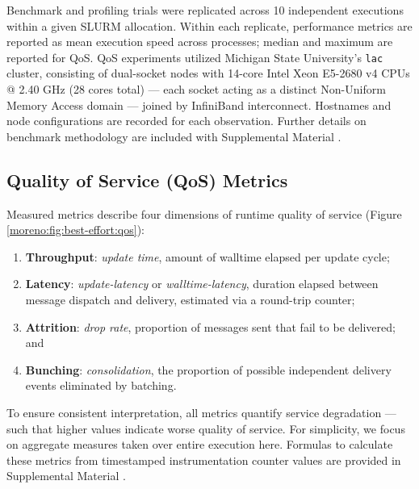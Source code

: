 Benchmark and profiling trials were replicated across 10 independent executions within a given SLURM allocation.
Within each replicate, performance metrics are reported as mean execution speed across processes; median and maximum are reported for QoS.
QoS experiments utilized Michigan State University's \texttt{lac} cluster, consisting of dual-socket nodes with 14-core Intel Xeon E5-2680 v4 CPUs @ 2.40 GHz (28 cores total) --- each socket acting as a distinct Non-Uniform Memory Access domain --- joined by InfiniBand interconnect.
Hostnames and node configurations are recorded for each observation.
Further details on benchmark methodology are included with Supplemental Material \cite{moreno_2026_trust}.

\subsection{Quality of Service (QoS) Metrics}
\label{moreno:sec:case1:metrics}

Measured metrics describe four dimensions of runtime quality of service (Figure \ref{moreno:fig:best-effort:qos}):
\begin{enumerate}
\item \textbf{Throughput}: \textit{update time}, amount of walltime elapsed per update cycle;
\item \textbf{Latency}: \textit{update-latency} or \textit{walltime-latency}, duration elapsed between message dispatch and delivery, estimated via a round-trip counter;
\item \textbf{Attrition}: \textit{drop rate}, proportion of messages sent that fail to be delivered; and
\item \textbf{Bunching}: \textit{consolidation}, the proportion of possible independent delivery events eliminated by batching.
\end{enumerate}

To ensure consistent interpretation, all metrics quantify service degradation --- such that higher values indicate worse quality of service.
For simplicity, we focus on aggregate measures taken over entire execution here.
Formulas to calculate these metrics from timestamped instrumentation counter values are provided in Supplemental Material \cite{moreno_2026_trust}.


